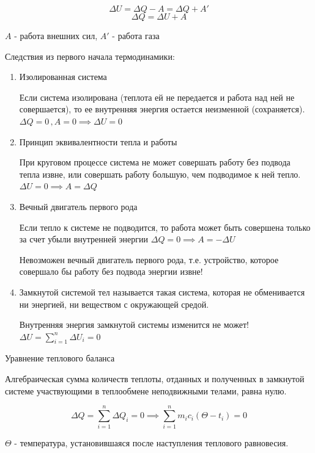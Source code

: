 $$\Delta U = \Delta Q - A = \Delta Q + A'$$ 
$$\Delta Q = \Delta U + A$$

$A$ - работа внешних сил, $A'$ - работа газа

\begin{remark}
    Следствия из первого начала термодинамики:

    \begin{enumerate}
        \item Изолированная система
        
        Если система изолирована (теплота ей не передается и работа 
        над ней не совершается), то ее внутренняя энергия остается 
        неизменной (сохраняется). $\Delta Q = 0 \, , A = 0 \implies \Delta U = 0$
        
        \item Принцип эквивалентности тепла и работы
        
        При круговом процессе система не может совершать работу без 
        подвода тепла извне, или совершать работу большую, чем 
        подводимое к ней тепло. $\Delta U = 0 \implies A = \Delta Q$

        \item Вечный двигатель первого рода

        Если тепло к системе не подводится, то работа может быть 
        совершена только за счет убыли внутренней энергии $\Delta Q = 0 \implies A = -\Delta U$

        Невозможен вечный двигатель первого рода, т.е. устройство, 
        которое совершало бы работу без подвода энергии извне!

        \item Замкнутой системой тел называется такая система, которая не 
        обменивается ни энергией, ни веществом с окружающей средой.

        Внутренняя энергия замкнутой системы изменится не может! $\Delta U = \sum\limits_{i=1}^{n} \Delta U_i = 0$
    \end{enumerate}
\end{remark}

\begin{definition}
    Уравнение теплового баланса

    Алгебраическая сумма количеств теплоты, отданных и полученных в 
    замкнутой системе участвующими в теплообмене неподвижными телами, 
    равна нулю.

    $$\Delta Q = \sum\limits_{i=1}^{n} \Delta Q_i = 0 \implies \sum\limits_{i=1}^{n} m_i c_i (\Theta - t_i) = 0$$

    $\Theta$ - температура, установившаяся после наступления теплового равновесия.
\end{definition}



